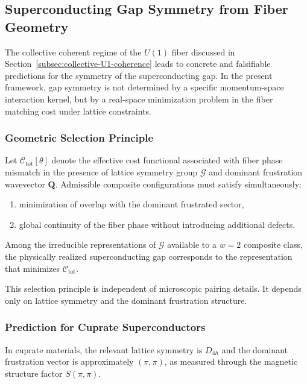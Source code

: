 \subsection{Superconducting Gap Symmetry from Fiber Geometry}
  \label{subsec:sc-gap-symmetry}

  The collective coherent regime of the $U(1)$ fiber discussed in
  Section~\ref{subsec:collective-U1-coherence} leads to concrete and
  falsifiable predictions for the symmetry of the superconducting gap.
  In the present framework, gap symmetry is not determined by a specific
  momentum-space interaction kernel, but by a real-space minimization
  problem in the fiber matching cost under lattice constraints.

  \subsubsection*{Geometric Selection Principle}

    Let $\mathcal{C}_{\text{tot}}[\theta]$ denote the effective cost functional
    associated with fiber phase mismatch in the presence of lattice
    symmetry group $\mathcal{G}$ and dominant frustration wavevector $\mathbf{Q}$.
    Admissible composite configurations must satisfy simultaneously:

    \begin{enumerate}
      \item minimization of overlap with the dominant frustrated sector,
      \item global continuity of the fiber phase without introducing additional defects.
    \end{enumerate}

    Among the irreducible representations of $\mathcal{G}$ available to a
    $w=2$ composite class, the physically realized superconducting gap
    corresponds to the representation that minimizes $\mathcal{C}_{\text{tot}}$.

    This selection principle is independent of microscopic pairing details.
    It depends only on lattice symmetry and the dominant frustration structure.

  \subsubsection*{Prediction for Cuprate Superconductors}

    In cuprate materials, the relevant lattice symmetry is $D_{4h}$ and
    the dominant frustration vector is approximately $(\pi,\pi)$,
    as measured through the magnetic structure factor $S(\pi,\pi)$.

